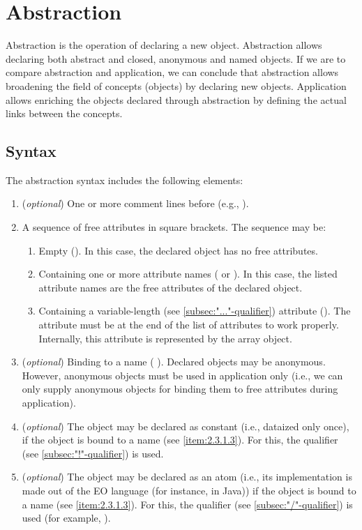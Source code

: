 \documentclass[12pt]{book}
\begin{document}
\section{Abstraction} \label{sec:abstracion}
Abstraction is the operation of declaring a new object. Abstraction allows declaring both abstract and closed, anonymous and named objects.
If we are to compare abstraction and application, we can conclude that abstraction allows broadening the field of concepts (objects) by declaring new objects. Application allows enriching the objects declared through abstraction by defining the actual links between the concepts.

\subsection{Syntax}
The abstraction syntax includes the following elements:

\begin{enumerate}
    \item (\textit{optional}) One or more comment lines before (e.g., ).
    \item A sequence of free attributes in square brackets. The sequence may be:
    \begin{enumerate}
        \item Empty (\ff{[]}). In this case, the declared object has no free attributes.
        \item Containing one or more attribute names (\ff{[a]} or \ff{[a b c d e]}). In this case, the listed attribute names are the free attributes of the declared object.
        \item Containing a variable-length (see \ref{subsec:"..."-qualifier}) attribute (\ff{[animals...]}). The attribute must be at the end of the list of attributes to work properly. Internally, this attribute is represented by the array object.
    \end{enumerate}
    \item \label{item:2.3.1.3} (\textit{optional}) Binding to a name ( ). Declared objects may be anonymous. However, anonymous objects must be used in application only (i.e., we can only supply anonymous objects for binding them to free attributes during application).
    \item (\textit{optional}) The object may be declared as constant (i.e., dataized only once), if the object is bound to a name (see \ref{item:2.3.1.3}). For this, the \ff{!} qualifier (see \ref{subsec:"!"-qualifier}) is used.
    \item (\textit{optional}) The object may be declared as an atom (i.e., its implementation is made out of the EO language (for instance, in Java)) if the object is bound to a name (see \ref{item:2.3.1.3}). For this, the \ff{/} qualifier (see \ref{subsec:"/"-qualifier}) is used (for example, ).
\end{enumerate}
\end{document}
